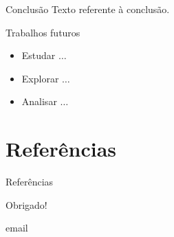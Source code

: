 \documentclass[11pt]{beamer}
\newcommand{\email}{email}
\begin{document}
\begin{frame}{Conclusão}
    Texto referente à conclusão.
\end{frame}

\begin{frame}{Trabalhos futuros}
    \begin{itemize}
        \item Estudar $\ldots$
        
        \medskip
        
        \item Explorar $\ldots$
        
        \medskip
        
        \item Analisar $\ldots$
    \end{itemize}
\end{frame}

\section{Referências}
\begin{frame}[allowframebreaks]{Referências}
    
\end{frame}

\begin{frame}

\begin{center}
    Obrigado!
    
    \email
\end{center}

\begin{figure}[htb]
    \centering
\end{figure}

\end{frame}
\end{document}
